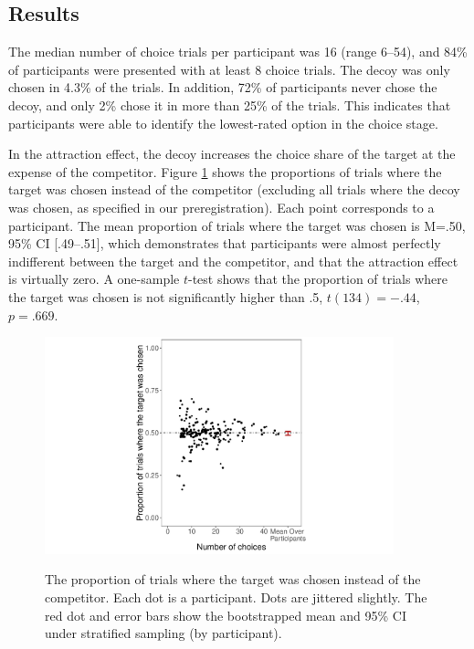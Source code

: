 \documentclass[12pt, a4paper]{article}
\begin{document}
\subsection*{Results}

The median number of choice trials per participant was 16 (range 6--54), and 84\% of participants were presented with at least 8 choice trials. The decoy was only chosen in 4.3\% of the trials. In addition, 72\% of participants never chose the decoy, and only 2\% chose it in more than 25\% of the trials. This indicates that participants were able to identify the lowest-rated option in the choice stage. 

In the attraction effect, the decoy increases the choice share of the target at the expense of the competitor. Figure \ref{fig:exp2_res} shows the proportions of trials where the target was chosen instead of the competitor (excluding all trials where the decoy was chosen, as specified in our preregistration). Each point corresponds to a participant. The mean proportion of trials where the target was chosen is M=.50, 95\% CI [.49--.51], which demonstrates that participants were almost perfectly indifferent between the target and the competitor, and that the attraction effect is virtually zero. A one-sample $t$-test shows that the proportion of trials where the target was chosen is not significantly higher than .5, $t(134)=-.44$, $p=.669$. 

\begin{figure}[htb!]
\centering
		\caption{The proportion of trials where the target was chosen instead of the competitor. Each dot is a participant. Dots are jittered slightly. The red dot and error bars show the bootstrapped mean and 95\% CI under stratified sampling (by participant).}
\includegraphics[width=0.9\textwidth]{figure4.pdf}
\label{fig:exp2_res}
\end{figure}
\end{document}
